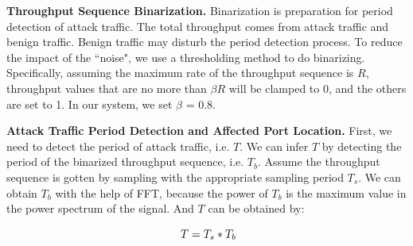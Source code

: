 
\noindent \textbf{Throughput Sequence Binarization.} Binarization is preparation for period detection of attack traffic. The total throughput comes from attack traffic and benign traffic. Benign traffic may disturb the period detection process. To reduce the impact of the ``noise", we use a thresholding method to do binarizing. Specifically, assuming the maximum rate of the throughput sequence is $R$, throughput values that are no more than $\beta R$ will be clamped to 0, and the others are set to 1. In our system, we set $\beta$ = 0.8.


\noindent \textbf{Attack Traffic Period Detection and Affected Port Location.} First, we need to detect the period of attack traffic, i.e. $T$. We can infer $T$ by detecting the period of the binarized throughput sequence, i.e. $T_b$. Assume the throughput sequence is gotten by sampling with the appropriate sampling period $T_s$. We can obtain $T_b$ with the help of FFT, because the power of $T_b$ is the maximum value in the power spectrum of the signal. And $T$ can be obtained by: 

\vspace{-0.05in}
\begin{equation}\label{eq:period}
\ T = T_s * T_b
\vspace{-0.05in}
\end{equation}

